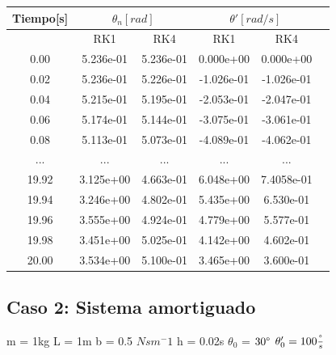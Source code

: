 \documentclass[titlepage,a4paper]{article}
\begin{document}
\begin{center}
    \begin{tabular}{| c | c | c | c | c | c|}
        \hline
       Tiempo[s] &\multicolumn{2}{|c|}{$\theta_n[rad]$} &\multicolumn{2}{|c|}{$\theta'[rad/s]$} \tabularnewline
        \hline
        &RK1&RK4&RK1&RK4\\
        \hline
        0.00&5.236e-01&5.236e-01&0.000e+00&0.000e+00\\
        0.02&5.236e-01&5.226e-01&-1.026e-01&-1.026e-01\\
        0.04&5.215e-01&5.195e-01&-2.053e-01&-2.047e-01\\
        0.06&5.174e-01&5.144e-01&-3.075e-01&-3.061e-01\\
        0.08&5.113e-01&5.073e-01&-4.089e-01&-4.062e-01\\
        ...&...&...&...&...\\
        19.92&3.125e+00&4.663e-01&6.048e+00&7.4058e-01\\
        19.94&3.246e+00&4.802e-01&5.435e+00&6.530e-01\\
        19.96&3.555e+00&4.924e-01&4.779e+00&5.577e-01\\
        19.98&3.451e+00&5.025e-01&4.142e+00&4.602e-01\\
        20.00&3.534e+00&5.100e-01&3.465e+00&3.600e-01\\
        \hline
    \end{tabular}
\end{center}

\subsection{Caso 2: Sistema amortiguado}

\begin{center}
    m = 1kg \hspace{3mm}
    L = 1m \hspace{3mm}
    b = 0.5 $Nsm^-1$ \hspace{3mm}
    h = 0.02s \hspace{3mm}
    $\theta_0$ = $30\degree$ \hspace{3mm}
    $\theta'_0 = 100\frac{\degree}{s}$ \hspace{3mm}
\end{center}
\end{document}
